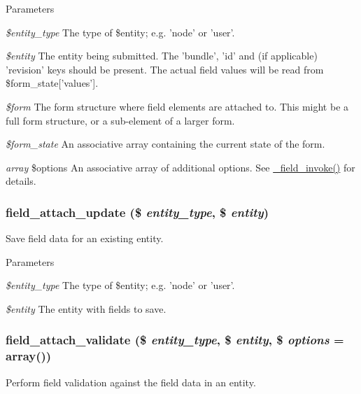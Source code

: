 \begin{DoxyParams}{Parameters}
\item[{\em \$entity\_\-type}]The type of \$entity; e.g. 'node' or 'user'. \item[{\em \$entity}]The entity being submitted. The 'bundle', 'id' and (if applicable) 'revision' keys should be present. The actual field values will be read from \$form\_\-state\mbox{[}'values'\mbox{]}. \item[{\em \$form}]The form structure where field elements are attached to. This might be a full form structure, or a sub-\/element of a larger form. \item[{\em \$form\_\-state}]An associative array containing the current state of the form. \item[{\em array}]\$options An associative array of additional options. See \hyperlink{group__field__attach_ga65f891a5eea6513f8505f5cfc5894896}{\_\-field\_\-invoke()} for details. \end{DoxyParams}
\hypertarget{group__field__attach_ga8d15efdca36306ea04552bed4986e77b}{
\subsubsection[{field\_\-attach\_\-update}]{\setlength{\rightskip}{0pt plus 5cm}field\_\-attach\_\-update (\$ {\em entity\_\-type}, \/  \$ {\em entity})}}
\label{group__field__attach_ga8d15efdca36306ea04552bed4986e77b}
Save field data for an existing entity.


\begin{DoxyParams}{Parameters}
\item[{\em \$entity\_\-type}]The type of \$entity; e.g. 'node' or 'user'. \item[{\em \$entity}]The entity with fields to save. \end{DoxyParams}
\hypertarget{group__field__attach_gae56981a9c1006e9c54f695f0ed515cd1}{
\subsubsection[{field\_\-attach\_\-validate}]{\setlength{\rightskip}{0pt plus 5cm}field\_\-attach\_\-validate (\$ {\em entity\_\-type}, \/  \$ {\em entity}, \/  \$ {\em options} = {\ttfamily array()})}}
\label{group__field__attach_gae56981a9c1006e9c54f695f0ed515cd1}
Perform field validation against the field data in an entity.

